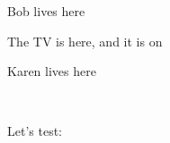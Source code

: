 		\begin{RpgMap}[header-offset=0,title={A test map}]
			
			 Bob lives here

			\begin{RpgMap}[prefix={}]
				 The TV is here, and it is on
				\RpgArea[cot]{}
			\end{RpgMap}

			 Karen lives here
			\RpgArea{}
		\end{RpgMap}
		

		~

		Let's test: 
